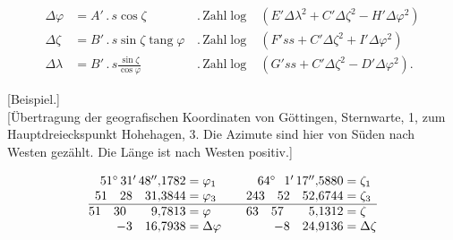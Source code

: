 \[
\begin{alignedat}{2}
\Delta\varphi&=A'\,.\,s\cos\zeta
&\,.\,\text{Zahl}\log&(E'\Delta\lambda^2+C'\Delta\zeta^2-H'\Delta\varphi^2)\\
\Delta\zeta&=B'\,.\,s\sin\zeta\operatorname{tang}\varphi
&\,.\,\text{Zahl}\log&(F'ss+C'\Delta\zeta^2+I'\Delta\varphi^2)\\
\Delta\lambda&=B'\,.\,s\frac{\sin\zeta}{\cos\varphi}
&\,.\,\text{Zahl}\log&(G'ss+C'\Delta\zeta^2-D'\Delta\varphi^2).
\end{alignedat}
\]

\begin{center}
[Beispiel.]\\[.5ex]
{[Übertragung der geografischen Koordinaten von Göttingen, Sternwarte, 1,
zum Hauptdreieckspunkt Hohehagen, 3. Die Azimute sind hier
von Süden nach Westen gezählt. Die Länge ist nach Westen positiv.]}
\end{center}
\[
\begin{array}{@{}r@{\;}l@{\qquad}r@{\;}l@{}}
51^\circ\,31'\,48''{,}1782&=\varphi_1&64^\circ\phantom{0}\,1'\,17''{,}5880&=\zeta_1\\
51\quad28\quad31{,}3844&=\varphi_3&243\quad52\quad52{,}6744&=\zeta_3\\
\hline
51\quad30\qquad9{,}7813&=\varphi&63\quad57\qquad5{,}1312&=\zeta\\
-3\quad16{,}7938&=\Delta\varphi&-8\quad24{,}9136&=\Delta\zeta
\end{array}
\]

